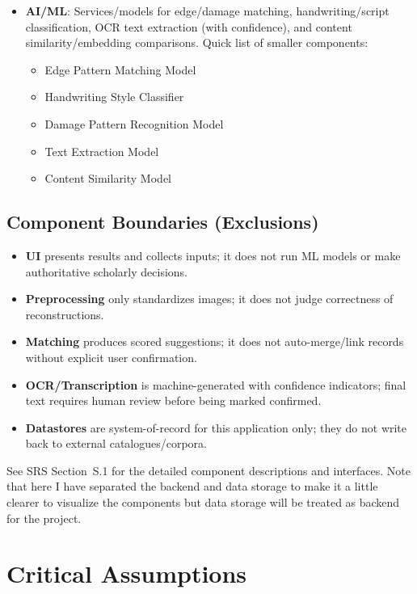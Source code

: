 \documentclass{article}
\begin{document}
\begin{itemize}
  \item \textbf{AI/ML}: Services/models for edge/damage matching, handwriting/script classification, OCR text extraction (with confidence), and content similarity/embedding comparisons. Quick list of smaller components:
  \begin{itemize} 
    \item Edge Pattern Matching Model
    \item Handwriting Style Classifier
    \item Damage Pattern Recognition Model
    \item Text Extraction Model
    \item Content Similarity Model
   \end{itemize}
\end{itemize}

\subsection*{Component Boundaries (Exclusions)}
\begin{itemize}
  \item \textbf{UI} presents results and collects inputs; it does not run ML models or make authoritative scholarly decisions.
  \item \textbf{Preprocessing} only standardizes images; it does not judge correctness of reconstructions.
  \item \textbf{Matching} produces scored suggestions; it does not auto-merge/link records without explicit user confirmation.
  \item \textbf{OCR/Transcription} is machine-generated with confidence indicators; final text requires human review before being marked confirmed.
  \item \textbf{Datastores} are system-of-record for this application only; they do not write back to external catalogues/corpora.
\end{itemize}

See SRS Section~S.1 for the detailed component descriptions and interfaces. Note that here I have separated the backend and data storage to make it a little clearer to visualize the components but data storage will be treated as backend for the project.

\section{Critical Assumptions}

\end{document}
